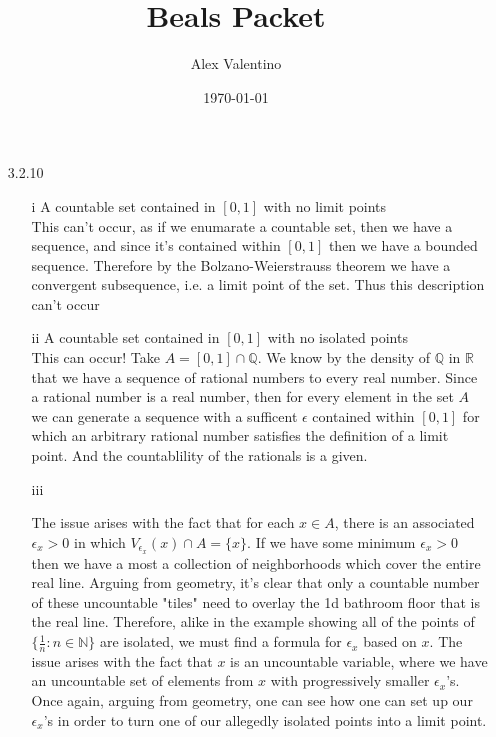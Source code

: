 \documentclass[12pt, letterpaper]{article}
\date{\today}
\author{Alex Valentino}
\title{Beals Packet}
\newcommand{\N}{\mathbb{N}}
\newcommand{\R}{\mathbb{R}}
\newcommand{\Q}{\mathbb{Q}}
\begin{document}
	\begin{enumerate}
		\item[3.2.10]
			\begin{itemize}
				\item[i] A countable set contained in $[0,1]$ with no limit points\\
				This can't occur, as if we enumarate a countable set, then we have
				a sequence, and since it's contained within $[0,1]$ then we have
				a bounded sequence.  Therefore by the Bolzano-Weierstrauss theorem
				we have a convergent subsequence, i.e. a limit point of the set.  
				Thus this description can't occur
				\item[ii]  A countable set contained in $[0,1]$ with no isolated points\\
				This can occur!  Take $A = [0,1] \cap \Q$.  We know by the density of $\Q$ in $\R$ that we have a sequence of rational numbers to every
				real number.  Since a rational number is a real number, then for every element in the set $A$ we can generate a sequence with a sufficent $\epsilon$ contained within $[0,1]$ for which an arbitrary rational number satisfies the definition of a limit point.  And the countablility of the rationals
				is a given.  
				\item[iii]
				
				The issue arises with the fact that for each $x \in A$, there is an associated $\epsilon_x > 0$ in which $V_{\epsilon_x} (x) \cap A = \{x\}$. If we have some minimum $\epsilon_x > 0$ then we have a most a collection of neighborhoods which cover the entire real line.  Arguing from geometry, it's clear that only a countable number of these uncountable "tiles" need to overlay the 1d bathroom floor that is the real line.  Therefore, alike in the example showing all of the points of $\{\frac{1}{n}: n \in \N\}$ are isolated, we must find a formula for $\epsilon_x$ based on $x$.  The issue arises with the fact that $x$ is an uncountable variable, where we have an uncountable set of elements from $x$ with progressively smaller $\epsilon_x$'s. Once again, arguing from geometry, one can see how one can set up our $\epsilon_x$'s in order to turn one of our allegedly isolated points into a limit point.  
				
				
				

\end{itemize}
\end{enumerate}
\end{document}
